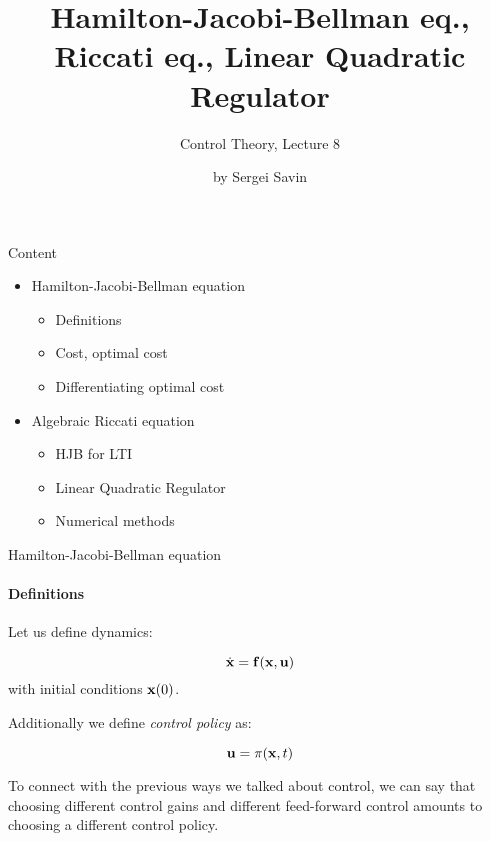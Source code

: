 \documentclass{beamer}
\title{Hamilton-Jacobi-Bellman eq., Riccati eq., Linear Quadratic Regulator}
\subtitle{Control Theory, Lecture 8}
\author{by Sergei Savin}
\date{\mydate}
\begin{document}
\maketitle


\begin{frame}{Content}
\begin{itemize}
\item Hamilton-Jacobi-Bellman equation
\begin{itemize}
    \item Definitions
    \item Cost, optimal cost
    \item Differentiating optimal cost
\end{itemize}
\item Algebraic Riccati equation
\begin{itemize}
    \item HJB for LTI
    \item Linear Quadratic Regulator
    \item Numerical methods
\end{itemize}
\end{itemize}
\end{frame}

\begin{frame}{Hamilton-Jacobi-Bellman equation}
\framesubtitle{Definitions}
\begin{flushleft}

Let us define dynamics:

\begin{equation}
    \dot {\mathbf{x}} = \mathbf{f} (\mathbf{x}, \mathbf{u})
\end{equation}
%
with initial conditions $\mathbf{x}(0)$. 

\bigskip

Additionally we define \emph{control policy} as:

\begin{equation}
    \mathbf{u} = \pi (\mathbf{x}, t)
\end{equation}

To connect with the previous ways we talked about control, we can say that choosing different control gains and different feed-forward control amounts to choosing a different control policy.

\end{flushleft}
\end{frame}
\end{document}
